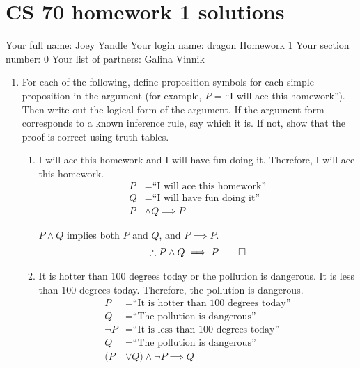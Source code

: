 \documentclass[11pt,fleqn]{article}
\begin{document}
\section*{CS 70 homework 1 solutions}

Your full name: Joey Yandle
\newline
Your login name: dragon
\newline
Homework 1
\newline
Your section number: 0
\newline
Your list of partners: Galina Vinnik
\newline

\begin{enumerate}
\item
For each of the following, define proposition
symbols for each simple proposition in the argument (for example, $P$ =
``I will ace this homework''). Then write out the logical form of
the argument. If the argument form corresponds to a known inference
rule, say which it is. If not, show that the proof is correct using
truth tables.
\begin{enumerate}
\item  I will ace this homework and I will have fun doing it.
Therefore, I will ace this homework.
\begin{align}
  P &= \text{``I will ace this homework''}\\
  Q &= \text{``I will have fun doing it''}\\
  P &\land Q \implies P
\end{align}

$P \land Q$ implies both $P$ and $Q$, and $P \implies P$.
\begin{align}
\therefore P \land Q \implies P\qed
\end{align}

\item It is hotter than 100 degrees today or the pollution is
dangerous. It is less than 100 degrees today. Therefore, the pollution
is dangerous.
\begin{align}
  P &= \text{``It is hotter than 100 degrees today''}\\
  Q &= \text{``The pollution is dangerous''}\\
  \neg P &= \text{``It is less than 100 degrees today''}\\
  Q &= \text{``The pollution is dangerous''}\\
  (P &\lor Q) \land \neg P \implies Q
\end{align}


\end{enumerate}
\end{enumerate}
\end{document}
